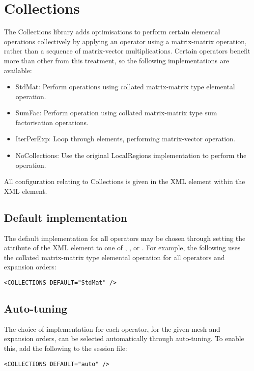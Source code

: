 \section{Collections}
The Collections library adds optimisations to perform certain elemental
operations collectively by applying an operator using a matrix-matrix operation,
rather than a sequence of matrix-vector multiplications. Certain operators
benefit more than other from this treatment, so the following implementations
are available:
\begin{itemize}
    \item StdMat: Perform operations using collated matrix-matrix type elemental
        operation.
    \item SumFac: Perform operation using collated matrix-matrix type sum
        factorisation operations.
    \item IterPerExp: Loop through elements, performing matrix-vector operation.
    \item NoCollections: Use the original LocalRegions implementation to
        perform the operation.
\end{itemize}
All configuration relating to Collections is given in the 
XML element within the  XML element.

\subsection{Default implementation}
The default implementation for all operators may be chosen through setting the
 attribute of the  XML element to one of
, ,  or . For
example, the following uses the collated matrix-matrix type elemental operation
for all operators and expansion orders:

\begin{lstlisting}[style=XmlStyle]
<COLLECTIONS DEFAULT="StdMat" />
\end{lstlisting}

\subsection{Auto-tuning}
The choice of implementation for each operator, for the given mesh and
expansion orders, can be selected automatically through 
auto-tuning. To enable this, add the following to the \nekpp session
file:

\begin{lstlisting}[style=XmlStyle]
<COLLECTIONS DEFAULT="auto" />
\end{lstlisting}

